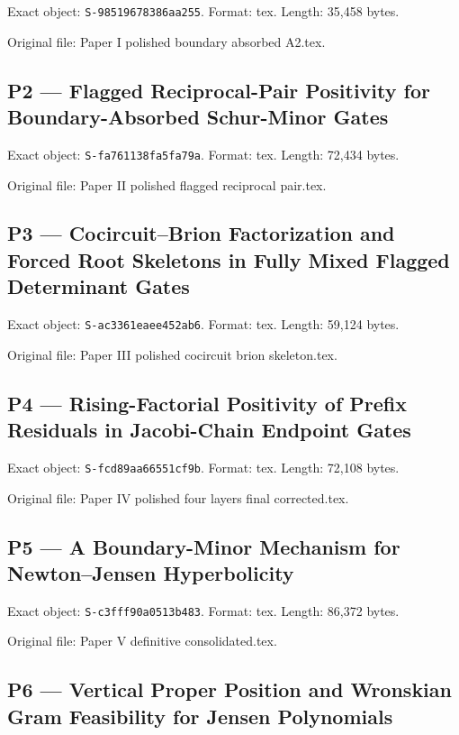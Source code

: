 \documentclass[
  10pt,
  a4paper,
  10pt,
  oneside,
  openany]{book}
\begin{document}
Exact object: \texttt{S-98519678386aa255}. Format: tex. Length: 35,458
bytes.

Original file: Paper I polished boundary absorbed A2.tex.

\subsection{P2 --- Flagged Reciprocal-Pair Positivity for
Boundary-Absorbed Schur-Minor Gates}\label{source-p2}

Exact object: \texttt{S-fa761138fa5fa79a}. Format: tex. Length: 72,434
bytes.

Original file: Paper II polished flagged reciprocal pair.tex.

\subsection{P3 --- Cocircuit--Brion Factorization and Forced Root
Skeletons in Fully Mixed Flagged Determinant Gates}\label{source-p3}

Exact object: \texttt{S-ac3361eaee452ab6}. Format: tex. Length: 59,124
bytes.

Original file: Paper III polished cocircuit brion skeleton.tex.

\subsection{P4 --- Rising-Factorial Positivity of Prefix Residuals in
Jacobi-Chain Endpoint Gates}\label{source-p4}

Exact object: \texttt{S-fcd89aa66551cf9b}. Format: tex. Length: 72,108
bytes.

Original file: Paper IV polished four layers final corrected.tex.

\subsection{P5 --- A Boundary-Minor Mechanism for Newton--Jensen
Hyperbolicity}\label{source-p5}

Exact object: \texttt{S-c3fff90a0513b483}. Format: tex. Length: 86,372
bytes.

Original file: Paper V definitive consolidated.tex.

\subsection{P6 --- Vertical Proper Position and Wronskian Gram
Feasibility for Jensen Polynomials}\label{source-p6}
\end{document}
